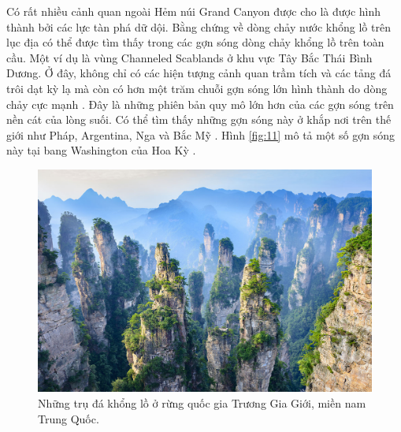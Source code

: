 \documentclass[10pt,twocolumn,letterpaper]{article}
\begin{document}
Có rất nhiều cảnh quan ngoài Hẻm núi Grand Canyon được cho là được hình thành bởi các lực tàn phá dữ dội. Bằng chứng về dòng chảy nước khổng lồ trên lục địa có thể được tìm thấy trong các gợn sóng dòng chảy khổng lồ trên toàn cầu. Một ví dụ là vùng Channeled Scablands ở khu vực Tây Bắc Thái Bình Dương. Ở đây, không chỉ có các hiện tượng cảnh quan trầm tích và các tảng đá trôi dạt kỳ lạ mà còn có hơn một trăm chuỗi gợn sóng lớn hình thành do dòng chảy cực mạnh \cite{78,79}. Đây là những phiên bản quy mô lớn hơn của các gợn sóng trên nền cát của lòng suối. Có thể tìm thấy những gợn sóng này ở khắp nơi trên thế giới như Pháp, Argentina, Nga và Bắc Mỹ \cite{81}. Hình \ref{fig:11} mô tả một số gợn sóng này tại bang Washington của Hoa Kỳ \cite{80}.
\begin{figure}[b]
\begin{center}
   \includegraphics[width=1\linewidth]{zhangjiajie.jpg}
\end{center}
   \caption{Những trụ đá khổng lồ ở rừng quốc gia Trương Gia Giới, miền nam Trung Quốc.}
\label{fig:12}
\label{fig:onecol}
\end{figure}
\end{document}
